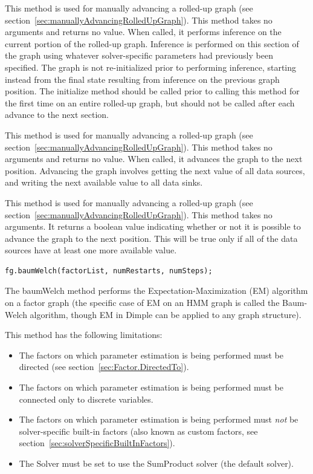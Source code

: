 
This method is used for manually advancing a rolled-up graph (see section~\ref{sec:manuallyAdvancingRolledUpGraph}).  This method takes no arguments and returns no value.  When called, it performs inference on the current portion of the rolled-up graph.  Inference is performed on this section of the graph using whatever solver-specific parameters had previously been specified.  The graph is not re-initialized prior to performing inference, starting instead from the final state resulting from inference on the previous graph position.  The initialize method should be called prior to calling this method for the first time on an entire rolled-up graph, but should not be called after each advance to the next section.


This method is used for manually advancing a rolled-up graph (see section~\ref{sec:manuallyAdvancingRolledUpGraph}).  This method takes no arguments and returns no value.  When called, it advances the graph to the next position.  Advancing the graph involves getting the next value of all data sources, and writing the next available value to all data sinks.


This method is used for manually advancing a rolled-up graph (see section~\ref{sec:manuallyAdvancingRolledUpGraph}).  This method takes no arguments.  It returns a boolean value indicating whether or not it is possible to advance the graph to the next position.  This will be true only if all of the data sources have at least one more available value.

\label{sec:FactorGraph.BaumWelch}

\begin{lstlisting}
fg.baumWelch(factorList, numRestarts, numSteps);
\end{lstlisting}

The baumWelch method performs the Expectation-Maximization (EM) algorithm on a factor graph (the specific case of EM on an HMM graph is called the Baum-Welch algorithm, though EM in Dimple can be applied to any graph structure).

This method has the following limitations:

\begin{itemize}
\item The factors on which parameter estimation is being performed must be directed (see section~\ref{sec:Factor.DirectedTo}).
\item The factors on which parameter estimation is being performed must be connected only to discrete variables.
\item The factors on which parameter estimation is being performed must \emph{not} be solver-specific built-in factors (also known as custom factors, see section~\ref{sec:solverSpecificBuiltInFactors}).
\item The Solver must be set to use the SumProduct solver (the default solver).
\end{itemize}

